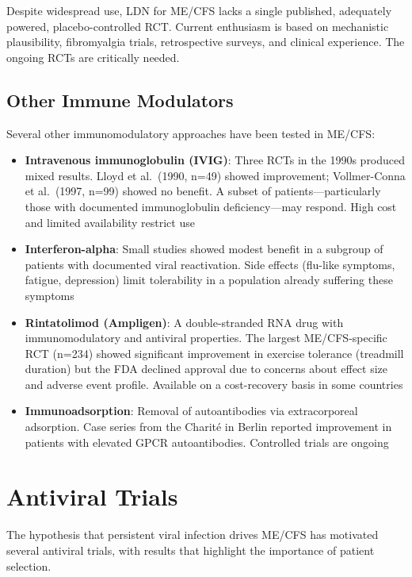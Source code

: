 \begin{limitation}
Despite widespread use, LDN for ME/CFS lacks a single published, adequately powered, placebo-controlled RCT. Current enthusiasm is based on mechanistic plausibility, fibromyalgia trials, retrospective surveys, and clinical experience. The ongoing RCTs are critically needed.
\end{limitation}

\subsection{Other Immune Modulators}

Several other immunomodulatory approaches have been tested in ME/CFS:

\begin{itemize}
    \item \textbf{Intravenous immunoglobulin (IVIG)}: Three RCTs in the 1990s produced mixed results. Lloyd et al.\ (1990, n=49) showed improvement; Vollmer-Conna et al.\ (1997, n=99) showed no benefit. A subset of patients---particularly those with documented immunoglobulin deficiency---may respond. High cost and limited availability restrict use
    \item \textbf{Interferon-alpha}: Small studies showed modest benefit in a subgroup of patients with documented viral reactivation. Side effects (flu-like symptoms, fatigue, depression) limit tolerability in a population already suffering these symptoms
    \item \textbf{Rintatolimod (Ampligen)}: A double-stranded RNA drug with immunomodulatory and antiviral properties. The largest ME/CFS-specific RCT (n=234) showed significant improvement in exercise tolerance (treadmill duration) but the FDA declined approval due to concerns about effect size and adverse event profile. Available on a cost-recovery basis in some countries
    \item \textbf{Immunoadsorption}: Removal of autoantibodies via extracorporeal adsorption. Case series from the Charit\'{e} in Berlin reported improvement in patients with elevated GPCR autoantibodies. Controlled trials are ongoing
\end{itemize}

\section{Antiviral Trials}
\label{sec:trials-antiviral}

The hypothesis that persistent viral infection drives ME/CFS has motivated several antiviral trials, with results that highlight the importance of patient selection.

